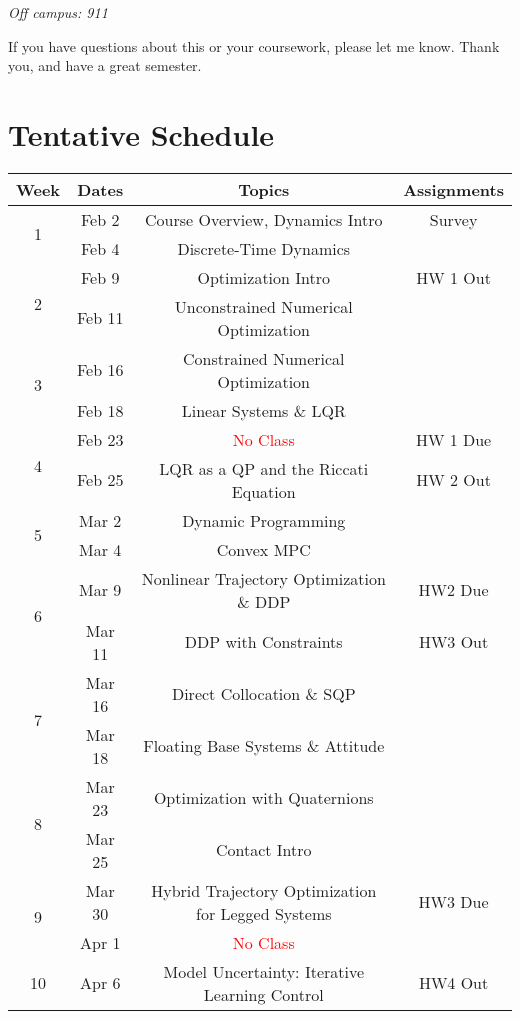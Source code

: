 \documentclass[11pt,letterpaper]{article}
\begin{document}
\textit{Off campus: 911}

\medskip
\noindent
If you have questions about this or your coursework, please let me know. Thank you, and have a great semester.


\section*{Tentative Schedule}

\begin{tabular}{c|c|c|c}
	Week & Dates & Topics & Assignments \\
	\hline
	\multirow{2}{*}{1} & Feb 2 & Course Overview, Dynamics Intro & Survey \\
	 & Feb 4 & Discrete-Time Dynamics &  \\
	\hline
	\multirow{2}{*}{2} & Feb 9 & Optimization Intro & HW 1 Out \\
	 & Feb 11 & Unconstrained Numerical Optimization &  \\
	\hline
	\multirow{2}{*}{3}  & Feb 16 & Constrained Numerical Optimization &  \\
	 & Feb 18 & Linear Systems \& LQR &  \\
	\hline
	\multirow{2}{*}{4}  & Feb 23 & \textcolor{red}{No Class} & HW 1 Due \\
	 & Feb 25 & LQR as a QP and the Riccati Equation & HW 2 Out \\
	\hline
	\multirow{2}{*}{5}  & Mar 2 & Dynamic Programming & \\
	 & Mar 4 & Convex MPC &  \\
	\hline
	\multirow{2}{*}{6}  & Mar 9 & Nonlinear Trajectory Optimization \& DDP &   HW2 Due \\
	 & Mar 11 & DDP with Constraints & HW3 Out \\
	\hline
	\multirow{2}{*}{7}  & Mar 16 & Direct Collocation \& SQP  & \\
	 & Mar 18 & Floating Base Systems \& Attitude & \\
	\hline
	\multirow{2}{*}{8}  & Mar 23 & Optimization with Quaternions & \\
	 & Mar 25 & Contact Intro & \\
	\hline
	\multirow{2}{*}{9}  & Mar 30 & Hybrid Trajectory Optimization for Legged Systems & HW3 Due \\
	 & Apr 1 & \textcolor{red}{No Class} &   \\
	\hline
	\multirow{2}{*}{10}  & Apr 6 & Model Uncertainty: Iterative Learning Control &  HW4 Out \\

\end{tabular}
\end{document}
